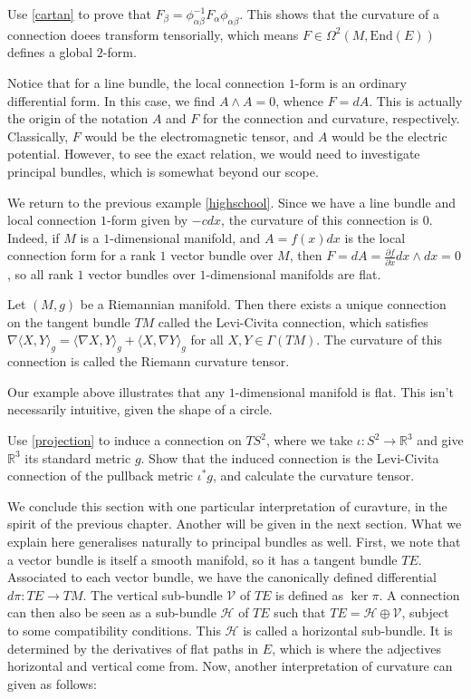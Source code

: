 \begin{exercise}
  Use \ref{cartan} to prove that $F_\beta=\phi^{-1}_{\alpha\beta}F_\alpha\phi_{\alpha\beta}$. This shows that the curvature of a connection doees transform tensorially, which means $F\in\Omega^2(M,\text{End}(E))$ defines a global $2$-form.
\end{exercise}
Notice that for a line bundle, the local connection $1$-form is an ordinary differential form. In this case, we find $A\wedge A=0$, whence $F=dA$. This is actually the origin of the notation $A$ and $F$ for the connection and curvature, respectively. Classically, $F$ would be the electromagnetic tensor, and $A$ would be the electric potential. However, to see the exact relation, we would need to investigate principal bundles, which is somewhat beyond our scope.
\begin{example}
  We return to the previous example \ref{highschool}. Since we have a line bundle and local connection $1$-form given by $-cdx$, the curvature of this connection is $0$. Indeed, if $M$ is a $1$-dimensional manifold, and $A=f(x)dx$ is the local connection form for a rank $1$ vector bundle over $M$, then $F=dA=\frac{\partial f}{\partial x}dx\wedge dx=0$, so all rank $1$ vector bundles over $1$-dimensional manifolds are flat.
\end{example}
\begin{theorem}
  Let $(M,g)$ be a Riemannian manifold. Then there exists a unique connection on the tangent bundle $TM$ called the Levi-Civita connection, which satisfies $\nabla\langle X,Y\rangle_g=\langle\nabla X,Y\rangle_g+\langle X,\nabla Y\rangle_g$ for all $X,Y\in\Gamma(TM)$. The curvature of this connection is called the Riemann curvature tensor.
\end{theorem}
Our example above illustrates that any $1$-dimensional manifold is flat. This isn't necessarily intuitive, given the shape of a circle.
\begin{exercise}
  Use \ref{projection} to induce a connection on $TS^2$, where we take $\iota:S^2\to\mathbb{R}^3$ and give $\mathbb{R}^3$ its standard metric $g$. Show that the induced connection is the Levi-Civita connection of the pullback metric $\iota^*g$, and calculate the curvature tensor.
\end{exercise}
We conclude this section with one particular interpretation of curavture, in the spirit of the previous chapter. Another will be given in the next section. What we explain here generalises naturally to principal bundles as well. First, we note that a vector bundle is itself a smooth manifold, so it has a tangent bundle $TE$. Associated to each vector bundle, we have the canonically defined differential $d\pi:TE\to TM$. The vertical sub-bundle $\mathcal{V}$ of $TE$ is defined as $\ker\pi$. A connection can then also be seen as a sub-bundle $\mathcal{H}$ of $TE$ such that $TE=\mathcal{H}\oplus\mathcal{V}$, subject to some compatibility conditions. This $\mathcal{H}$ is called a horizontal sub-bundle. It is determined by the derivatives of flat paths in $E$, which is where the adjectives horizontal and vertical come from. Now, another interpretation of curvature can given as follows:
